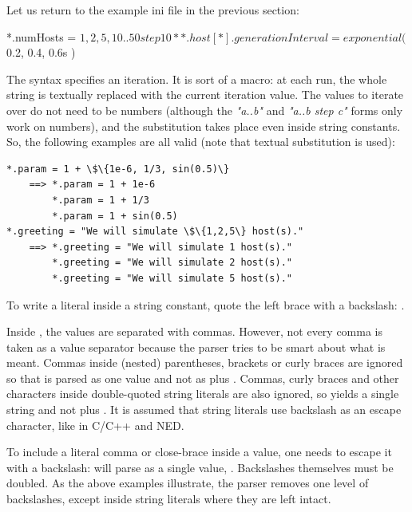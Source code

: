 Let us return to the example ini file in the previous section:

\begin{inifile}
*.numHosts = ${1, 2, 5, 10..50 step 10}
**.host[*].generationInterval = exponential( ${0.2, 0.4, 0.6}s )
\end{inifile}

The  syntax specifies an iteration. It is sort of a macro: at
each run, the whole  string is textually replaced with the
current iteration value. The values to iterate over do not need to be
numbers (although the \textit{"a..b"} and \textit{"a..b step c"} forms
only work on numbers), and the substitution takes place even inside
string constants. So, the following examples are all valid (note that
textual substitution is used):

\begin{Verbatim}[commandchars=\\\{\}]
*.param = 1 + \$\{1e-6, 1/3, sin(0.5)\}
    ==> *.param = 1 + 1e-6
        *.param = 1 + 1/3
        *.param = 1 + sin(0.5)
*.greeting = "We will simulate \$\{1,2,5\} host(s)."
    ==> *.greeting = "We will simulate 1 host(s)."
        *.greeting = "We will simulate 2 host(s)."
        *.greeting = "We will simulate 5 host(s)."
\end{Verbatim}

To write a literal  inside a string constant, quote
the left brace with a backslash: .

\begin{note}
Inside , the values are separated with commas. However,
not every comma is taken as a value separator because the parser
tries to be smart about what is meant. Commas inside (nested) parentheses,
brackets or curly braces are ignored so that  is
parsed as one value and not as  plus . Commas, curly
braces and other characters inside double-quoted string literals are
also ignored, so  yields a single 
string and not  plus . It is assumed that string literals
use backslash as an escape character, like in C/C++ and NED.

To include a literal comma or close-brace inside a value, one needs
to escape it with a backslash: 
will parse as a single value, . Backslashes themselves must be doubled.
As the above examples illustrate, the parser removes one level of backslashes,
except inside string literals where they are left intact.
\end{note}


